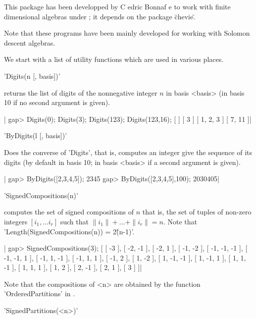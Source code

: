
This  package has been developped by C{ e}dric Bonnaf{ e}
to  work with  finite dimensional  algebras under  \GAP; it  depends on the
package \"chevie\".

Note  that  these  programs  have  been  mainly  developed for working with
Solomon descent algebras.


We start with a list of utility functions which are used in various places.

'Digits(n [, basis])'

returns  the list of digits of the nonnegative integer $n$ in basis <basis>
(in basis 10 if no second argument is given).

|    gap> Digits(0); Digits(3); Digits(123); Digits(123,16);
    [  ]
    [ 3 ]
    [ 1, 2, 3 ]
    [ 7, 11 ]|

'ByDigits(l [, basis])'

Does  the  converse  of  'Digits',  that  is,  computes an integer give the
sequence  of its  digits (by  default in  basis 10;  in basis  <basis> if a
second argument is given).

|    gap> ByDigits([2,3,4,5]);
    2345
    gap> ByDigits([2,3,4,5],100);
    2030405|

'SignedCompositions(n)'

computes  the set of signed compositions of  $n$ that is, the set of tuples
of  non-zero integers $[i_1,...i_r]$  such that $\|i_1\|  + ... + \|i_r\| =
n$. Note that 'Length(SignedCompositions(n)) = 2\^(n-1)'.

|    gap> SignedCompositions(3);
    [ [ -3 ], [ -2, -1 ], [ -2, 1 ], [ -1, -2 ], [ -1, -1, -1 ],
      [ -1, -1, 1 ], [ -1, 1, -1 ], [ -1, 1, 1 ], [ -1, 2 ], [ 1, -2 ],
      [ 1, -1, -1 ], [ 1, -1, 1 ], [ 1, 1, -1 ], [ 1, 1, 1 ], [ 1, 2 ],
      [ 2, -1 ], [ 2, 1 ], [ 3 ] ]|

Note that the compositions of <n> are obtained by the function
'OrderedPartitions' in \GAP.

'SignedPartitions(<n>)'

